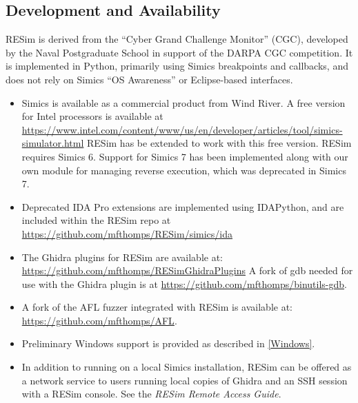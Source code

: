 \documentclass[titlepage]{article}
\begin{document}
\subsection{Development and Availability}
RESim is derived from the “Cyber Grand Challenge Monitor” (CGC), developed by the Naval Postgraduate School in support of the DARPA CGC competition.  
It is implemented in Python, primarily using Simics breakpoints and callbacks, and does not rely on 
Simics “OS Awareness” or Eclipse-based interfaces.   
\begin{itemize}
\item Simics is available as a commercial product from Wind River.  A free version for Intel processors is available at
\url{https://www.intel.com/content/www/us/en/developer/articles/tool/simics-simulator.html}  RESim has be extended to work with this
free version.  RESim requires Simics 6.  Support for Simics 7 has been implemented along with our own module for managing
reverse execution, which was deprecated in Simics 7.

\item Deprecated IDA Pro extensions are implemented using IDAPython, and are included within the RESim repo at
\url{https://github.com/mfthomps/RESim/simics/ida}  

\item The Ghidra plugins for RESim are available at: \url{https://github.com/mfthomps/RESimGhidraPlugins}  A fork 
of gdb needed for use with the Ghidra plugin is at \url{https://github.com/mfthomps/binutils-gdb}.

\item A fork of the AFL fuzzer integrated with 
RESim is available at: \url{https://github.com/mfthomps/AFL}.

\item Preliminary Windows support is provided as described in \ref{Windows}.

\item In addition to running on a local Simics installation, RESim can be offered as a network service to users running local copies of Ghidra and an SSH session with a RESim console.  See the \textit{RESim Remote Access Guide}.  
\end{itemize}
\end{document}
